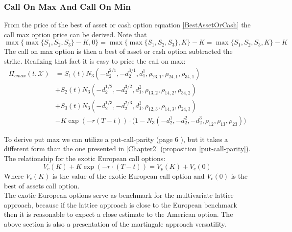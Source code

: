 \subsubsection{Call On Max And Call On Min}
From the price of the best of asset or cash option equation \eqref{BestAssetOrCash} the call max option price can be derived. Note that
$$\max\{\max\{ S_1,S_2,S_3 \} - K, 0\}=\max\{\max\{ S_1,S_2,S_3 \}, K\} - K = \max\{ S_1,S_2,S_3,K \} - K$$
The call on max option is then a best of asset or cash option subtracted the strike. Realizing that fact it is easy to price the call on max:
\begin{equation}\label{callMax}
\begin{split}
\Pi_{cmax}(t,\mathcal{X})&=S_1(t) N_3(-d_2^{2/1},-d_2^{3/1},d_1^{1}, \rho_{23,1}, \rho_{24,1}, \rho_{34,1}) \\
&+S_2(t) N_3(-d_2^{1/2},-d_2^{3/2},d_1^{2}, \rho_{13,2}, \rho_{14,2}, \rho_{34,2})\\
&+S_3(t) N_3(-d_2^{1/3},-d_2^{2/3},d_1^{3}, \rho_{12,3}, \rho_{14,3}, \rho_{24,3}) \\
&-K \exp(-r(T-t)) \cdot\bigg(1 - N_3(-d_2^1,-d_2^2,-d_2^3, \rho_{12}, \rho_{13}, \rho_{23})\bigg)
\end{split}
\end{equation}

To derive put max we can utilize a put-call-parity (page 6 \parencite{Ouwehand2006}), but it takes a different form than the one presented in \ref{Chapter2} (proposition \ref{put-call-parity}). The relationship for the exotic European call options:
\begin{equation}\label{putMin}
V_c(K)+K\exp(-r\cdot (T-t)) = V_p(K)+V_c(0)
\end{equation}
Where $V_c(K)$ is the value of the exotic European call option and $V_c(0)$ is the best of assets call option.\\

The exotic European options serve as benchmark for the multivariate lattice approach, because if the lattice approach is close to the European benchmark then it is reasonable to expect a close estimate to the American option. The above section is also a presentation of the martingale approach versatility. 



